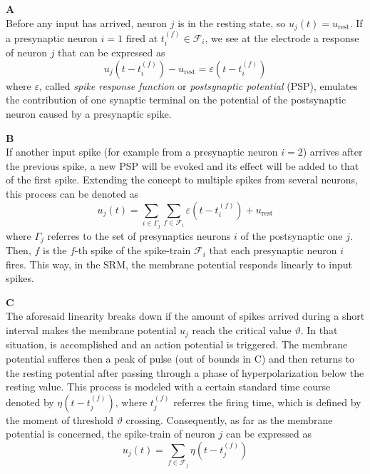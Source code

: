 \begin{description}

\item {\textbf{ A}\hfill \\
Before any input has arrived, neuron $j$ is in the resting state, so $u_{j}(t)=u_{\text{rest}}$.
If a presynaptic neuron $i=1$ fired at $t_{i}^{(f)} \in \mathcal{F}_{i}$, we see at the electrode a response of neuron $j$ that can be expressed as
\begin{equation}
u_{j}(t-t_{i}^{(f)})-u_{\text{rest}}=\varepsilon(t-t_{i}^{(f)})
\label{eq:postsynapticpotential}
\end{equation}
where $\varepsilon$, called \emph{spike response function}
or \emph{postsynaptic potential} (PSP), 
emulates the contribution of one synaptic terminal on the potential of the postsynaptic neuron caused by a presynaptic spike.
}

\item {\textbf{ B}\hfill \\
If another input spike (for example from a presynaptic neuron $i=2$) arrives after the previous spike, a new PSP will be evoked and its effect will be added to that of the first spike. Extending the concept to multiple spikes from several neurons, this process can be denoted as
\begin{equation}
u_{j}(t)=\sum_{i\in \Gamma_{j}}\sum_{f\in \mathcal{F}_{i}}
	\varepsilon(t-t_{i}^{(f)})+u_{\text{rest}}
\label{eq:pspgeneralised}
\end{equation}
where $\Gamma_{j}$ referres to the set of presynaptics neurons $i$ of the postsynaptic one $j$. Then, $f$ is the $f$-th spike of the spike-train $\mathcal{F}_{i}$ that each presynaptic neuron $i$ fires. This way, in the SRM, the membrane potential responds linearly to input spikes.
}

\item {\textbf{ C}\hfill \\
The aforesaid linearity breaks down if the amount of spikes arrived during a short interval makes the membrane potential $u_{j}$ reach the critical value $\vartheta$. In that situation,  is accomplished and an action potential is triggered. The membrane potential sufferes then a peak of pulse (out of bounds in C) and then returns to the resting potential after passing through a phase of hyperpolarization below the resting value. This 
process is modeled with a certain standard time course denoted by $\eta(t-t_{j}^{(f)})$, where $t_{j}^{(f)}$ referres the firing time, which is defined by the moment of threshold $\vartheta$ crossing. Consequently, as far as the membrane potential is concerned, the spike-train of neuron $j$ can be expressed as
\begin{equation}
u_{j}(t)=\sum_{f\in \mathcal{F}_{j}}\eta(t-t_{j}^{(f)})
\label{eq:refractoriness}
\end{equation}

}
\end{description}
